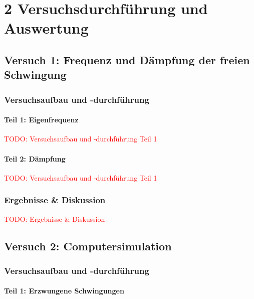 \chapter*{2 Versuchsdurchführung und Auswertung}
\setcounter{chapter}{2}
\setcounter{section}{0}
\setcounter{subsection}{0}

\section{Versuch 1: Frequenz und Dämpfung der freien Schwingung}

    \subsection{Versuchsaufbau und -durchführung}

        \subsubsection{Teil 1: Eigenfrequenz}
        
            \textcolor{red}{TODO: Versuchsaufbau und -durchführung Teil 1}

        \subsubsection{Teil 2: Dämpfung}
        
            \textcolor{red}{TODO: Versuchsaufbau und -durchführung Teil 1}

    \subsection{Ergebnisse \& Diskussion}

        \textcolor{red}{TODO: Ergebnisse \& Diskussion}

\newpage

\section{Versuch 2: Computersimulation}

    \subsection{Versuchsaufbau und -durchführung}

        \subsubsection{Teil 1: Erzwungene Schwingungen}
            
